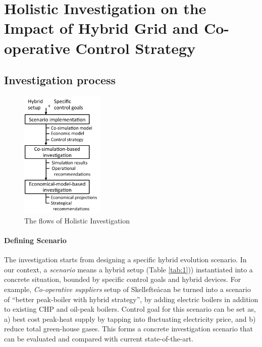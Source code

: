 \documentclass[conference]{IEEEtran}
\begin{document}

\section{Holistic Investigation on the Impact of Hybrid Grid and
  Co-operative Control Strategy}  
\label{sec:hol} 

\subsection{Investigation process}

\begin{figure}[t]
  \centering
  \includegraphics[width=40mm]{figures/holistic_flow.pdf}
  \caption{The flows of Holistic Investigation}
  \label{fig:flow}
\end{figure}

\paragraph{Defining Scenario} 
The investigation starts from designing a specific hybrid evolution
scenario. In our context, a {\em scenario} means a hybrid setup
(Table \ref{tab:1})) instantiated into a concrete situation, bounded
by specific control goals and hybrid devices. For example, {\em
  Co-operative suppliers} setup of Skellefte\aa can be turned into a
scenario of ``better peak-boiler with hybrid strategy'', by adding
electric boilers in addition to existing CHP and oil-peak
boilers. Control goal for this scenario can be set as, a) best cost
peak-heat supply by tapping into fluctuating electricity price, and b)
reduce total green-house gases. This forms a concrete investigation
scenario that can be evaluated and compared with current
state-of-the-art. 
\end{document}
